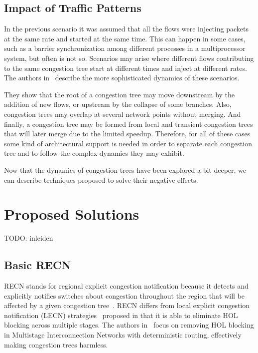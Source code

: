 \documentclass[12pt]{article}
\begin{document}
\subsection{Impact of Traffic Patterns}\label{S:traffic_patterns}

In the previous scenario it was assumed that all the flows were injecting packets at the same rate and started at the same time. This can happen in some cases, such as a barrier synchronization among different processes in a multiprocessor system, but often is not so. Scenarios may arise where different flows contributing to the same congestion tree start at different times and inject at different rates. The authors in~\cite{paper1} describe the more sophisticated dynamics of these scenarios.

They show that the root of a congestion tree may move downstream by the addition of new flows, or upstream by the collapse of some branches. Also, congestion trees may overlap at several network points without merging. And finally, a congestion tree may be formed from local and transient congestion trees that will later merge due to the limited speedup. Therefore, for all of these cases some kind of architectural support is needed in order to separate each congestion tree and to follow the complex dynamics they may exhibit. 

Now that the dynamics of congestion trees have been explored a bit deeper, we can describe techniques proposed to solve their negative effects.

\section{Proposed Solutions}\label{S:solutions}

TODO: inleiden

\subsection{Basic RECN}\label{S:basic_recn}

RECN stands for regional explicit congestion notification because it detects and explicitly notifies switches about congestion throughout the region that will be affected by a given congestion tree~\cite{paper2}. RECN differs from local explicit congestion notification (LECN) strategies~\cite{KM04} proposed in that it is able to eliminate HOL blocking across multiple stages. The authors in~\cite{paper2} focus on removing HOL blocking in Multistage Interconnection Networks with deterministic routing, effectively making congestion trees harmless. 
\end{document}
